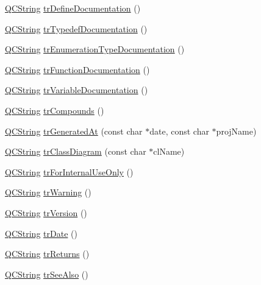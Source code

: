 \begin{DoxyCompactItemize}
\item 
\hyperlink{class_q_c_string}{Q\+C\+String} \hyperlink{class_translator_portuguese_a08b6adb52f21b563a4f6521fd6f32fd6}{tr\+Define\+Documentation} ()
\item 
\hyperlink{class_q_c_string}{Q\+C\+String} \hyperlink{class_translator_portuguese_ad4fa7d15e54a3cf40a5b84e904eee276}{tr\+Typedef\+Documentation} ()
\item 
\hyperlink{class_q_c_string}{Q\+C\+String} \hyperlink{class_translator_portuguese_ae3ce12563127799cd09934f433cf678a}{tr\+Enumeration\+Type\+Documentation} ()
\item 
\hyperlink{class_q_c_string}{Q\+C\+String} \hyperlink{class_translator_portuguese_a277d6b492ad5399b1e8e24f9cc8d2715}{tr\+Function\+Documentation} ()
\item 
\hyperlink{class_q_c_string}{Q\+C\+String} \hyperlink{class_translator_portuguese_a20cc092c5f3ceeb96718275d57bf807c}{tr\+Variable\+Documentation} ()
\item 
\hyperlink{class_q_c_string}{Q\+C\+String} \hyperlink{class_translator_portuguese_aa974995ae597bf8818937c9e00a4c103}{tr\+Compounds} ()
\item 
\hyperlink{class_q_c_string}{Q\+C\+String} \hyperlink{class_translator_portuguese_a693f9bfd3274ee9d4213cf04bf20192c}{tr\+Generated\+At} (const char $\ast$date, const char $\ast$proj\+Name)
\item 
\hyperlink{class_q_c_string}{Q\+C\+String} \hyperlink{class_translator_portuguese_a16a9449da5b8b5b9d8d930367ac9e089}{tr\+Class\+Diagram} (const char $\ast$cl\+Name)
\item 
\hyperlink{class_q_c_string}{Q\+C\+String} \hyperlink{class_translator_portuguese_a27fad9077f707adbed8f5a00060e3492}{tr\+For\+Internal\+Use\+Only} ()
\item 
\hyperlink{class_q_c_string}{Q\+C\+String} \hyperlink{class_translator_portuguese_af7a7513d569c37b9133bb8c63e9b6420}{tr\+Warning} ()
\item 
\hyperlink{class_q_c_string}{Q\+C\+String} \hyperlink{class_translator_portuguese_a6026e4f3c598b15748761d53cc48914f}{tr\+Version} ()
\item 
\hyperlink{class_q_c_string}{Q\+C\+String} \hyperlink{class_translator_portuguese_a8cf39fc583129912800db26379efe8b5}{tr\+Date} ()
\item 
\hyperlink{class_q_c_string}{Q\+C\+String} \hyperlink{class_translator_portuguese_ac3fed63636617d973fdb1e745e1ac65e}{tr\+Returns} ()
\item 
\hyperlink{class_q_c_string}{Q\+C\+String} \hyperlink{class_translator_portuguese_ad2a4a2483a58c22915bbe488d072afad}{tr\+See\+Also} ()

\end{DoxyCompactItemize}
